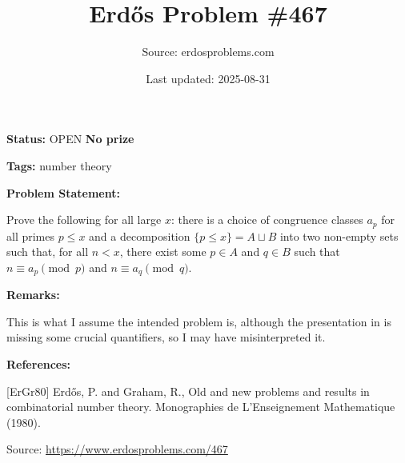 \documentclass{article}
\title{Erd\H{o}s Problem \#467}
\date{Last updated: 2025-08-31}
\author{Source: erdosproblems.com}
\begin{document}
\maketitle

\noindent\textbf{Status:} OPEN \quad \textbf{No prize}

\noindent\textbf{Tags:} number theory

\medskip
\noindent\textbf{Problem Statement:}

Prove the following for all large $x$: there is a choice of congruence classes $a_p$ for all primes $p\leq x$ and a decomposition $\{p\leq x\}=A\sqcup B$ into two non-empty sets such that, for all $n<x$, there exist some $p\in A$ and $q\in B$ such that $n\equiv a_p\pmod{p}$ and $n\equiv a_q\pmod{q}$.

\bigskip
\noindent\textbf{Remarks:}

This is what I assume the intended problem is, although the presentation in \cite{ErGr80} is missing some crucial quantifiers, so I may have misinterpreted it.

\bigskip
\noindent\textbf{References:}

[ErGr80] Erd\H{o}s, P. and Graham, R., Old and new problems and results in combinatorial number theory. Monographies de L'Enseignement Mathematique (1980).

\bigskip
\noindent\small{Source: \url{https://www.erdosproblems.com/467}}
\end{document}
